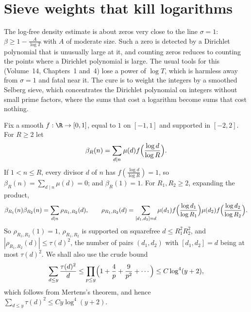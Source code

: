 \section{Sieve weights that kill logarithms}

The log-free density estimate is about zeros very close to the line $\sigma=1$: $\beta\ge1-\frac A{\log T}$ with $A$ of moderate size. Such a zero is detected by a Dirichlet polynomial that is unusually large at it, and counting zeros reduces to counting the points where a Dirichlet polynomial is large. The usual tools for this (Volume~14, Chapters~1 and~4) lose a power of $\log T$, which is harmless away from $\sigma=1$ and fatal near it. The cure is to weight the integers by a smoothed Selberg sieve, which concentrates the Dirichlet polynomial on integers without small prime factors, where the sums that cost a logarithm become sums that cost nothing.

Fix a smooth $f:\R\to[0,1]$, equal to $1$ on $[-1,1]$ and supported in $[-2,2]$. For $R\ge2$ let
\[
\beta_R(n)=\sum_{d\mid n}\mu(d)f\Bigl(\frac{\log d}{\log R}\Bigr).
\]
If $1<n\le R$, every divisor $d$ of $n$ has $f(\frac{\log d}{\log R})=1$, so $\beta_R(n)=\sum_{d\mid n}\mu(d)=0$; and $\beta_R(1)=1$. For $R_1,R_2\ge2$, expanding the product,
\[
\beta_{R_1}(n)\beta_{R_2}(n)=\sum_{d\mid n}\rho_{R_1,R_2}(d),\qquad\rho_{R_1,R_2}(d)=\sum_{[d_1,d_2]=d}\mu(d_1)f\Bigl(\frac{\log d_1}{\log R_1}\Bigr)\mu(d_2)f\Bigl(\frac{\log d_2}{\log R_2}\Bigr).
\]
So $\rho_{R_1,R_2}(1)=1$, $\rho_{R_1,R_2}$ is supported on squarefree $d\le R_1^2R_2^2$, and $|\rho_{R_1,R_2}(d)|\le\tau(d)^2$, the number of pairs $(d_1,d_2)$ with $[d_1,d_2]=d$ being at most $\tau(d)^2$. We shall also use the crude bound
\[
\sum_{d\le y}\frac{\tau(d)^2}d\le\prod_{p\le y}\Bigl(1+\frac4p+\frac9{p^2}+\cdots\Bigr)\le C\log^4(y+2),
\]
which follows from Mertens's theorem, and hence $\sum_{d\le y}\tau(d)^2\le Cy\log^4(y+2)$.

